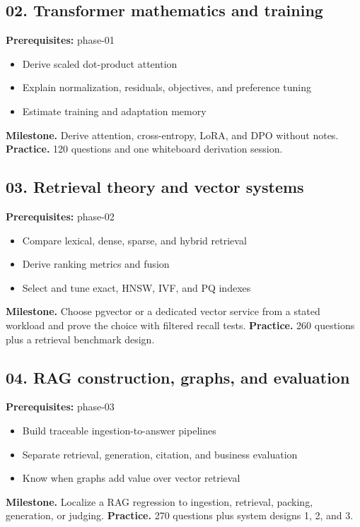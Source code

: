 \subsection{02. Transformer mathematics and training}
 \quad \textbf{Prerequisites:} phase-01
\begin{itemize}
\item Derive scaled dot-product attention
\item Explain normalization, residuals, objectives, and preference tuning
\item Estimate training and adaptation memory
\end{itemize}
\textbf{Milestone.} Derive attention, cross-entropy, LoRA, and DPO without notes.
\textbf{Practice.} 120 questions and one whiteboard derivation session.
\subsection{03. Retrieval theory and vector systems}
 \quad \textbf{Prerequisites:} phase-02
\begin{itemize}
\item Compare lexical, dense, sparse, and hybrid retrieval
\item Derive ranking metrics and fusion
\item Select and tune exact, HNSW, IVF, and PQ indexes
\end{itemize}
\textbf{Milestone.} Choose pgvector or a dedicated vector service from a stated workload and prove the choice with filtered recall tests.
\textbf{Practice.} 260 questions plus a retrieval benchmark design.
\subsection{04. RAG construction, graphs, and evaluation}
 \quad \textbf{Prerequisites:} phase-03
\begin{itemize}
\item Build traceable ingestion-to-answer pipelines
\item Separate retrieval, generation, citation, and business evaluation
\item Know when graphs add value over vector retrieval
\end{itemize}
\textbf{Milestone.} Localize a RAG regression to ingestion, retrieval, packing, generation, or judging.
\textbf{Practice.} 270 questions plus system designs 1, 2, and 3.
